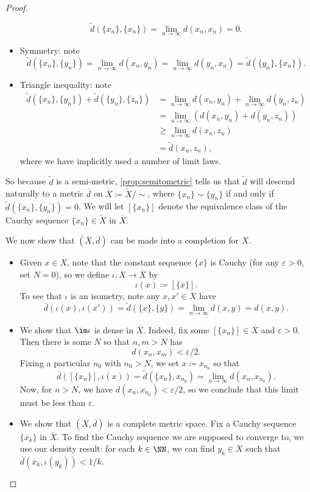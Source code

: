 \documentclass[../notes.tex]{subfiles}
\begin{document}
\begin{proof}
\begin{itemize}
		\[\widetilde d(\{x_n\},\{x_n\})=\lim_{n\to\infty}d(x_n,x_n)=0.\]
		\item Symmetry: note
		\[\widetilde d(\{x_n\},\{y_n\})=\lim_{n\to\infty}d(x_n,y_n)=\lim_{n\to\infty}d(y_n,x_n)=\widetilde d(\{y_n\},\{x_n\}).\]
		\item Triangle inequality: note
		\begin{align*}
			\widetilde d(\{x_n\},\{y_n\})+\widetilde d(\{y_n\},\{z_n\}) &= \lim_{n\to\infty}d(x_n,y_n)+\lim_{n\to\infty}d(y_n,z_n) \\
			&= \lim_{n\to\infty}(d(x_n,y_n)+d(y_n,z_n)) \\
			&\ge \lim_{n\to\infty}d(x_n,z_n) \\
			&= \widetilde d(x_n,z_n),
		\end{align*}
		where we have implicitly used a number of limit laws.
	\end{itemize}
	So because $\widetilde d$ is a semi-metric, \autoref{prop:semitometric} tells us that $\widetilde d$ will descend naturally to a metric $\overline d$ on $\overline X\coloneqq\widetilde X/{\sim}$, where $\{x_n\}\sim\{y_n\}$ if and only if $\widetilde d(\{x_n\},\{y_n\})=0$. We will let $[\{x_n\}]$ denote the equivalence class of the Cauchy sequence $\{x_n\}\in\widetilde X$ in $\overline X$.

	We now show that $(\overline X,\overline d)$ can be made into a completion for $X$.
	\begin{itemize}
		\item Given $x\in X$, note that the constant sequence $\{x\}$ is Cauchy (for any $\varepsilon>0$, set $N=0$), so we define $\iota\colon X\to\overline X$ by
		\[\iota(x)\coloneqq[\{x\}].\]
		To see that $\iota$ is an isometry, note any $x,x'\in X$ have
		\[\overline d(\iota(x),\iota(x'))=\widetilde d(\{x\},\{y\})=\lim_{n\to\infty}d(x,y)=d(x,y).\]
		\item We show that $\im\iota$ is dense in $\overline X$. Indeed, fix some $[\{x_n\}]\in\overline X$ and $\varepsilon>0$. Then there is some $N$ so that $n,m>N$ has
		\[d(x_n,x_m)<\varepsilon/2.\]
		Fixing a particular $n_0$ with $n_0>N$, we set $x\coloneqq x_{n_0}$ so that
		\[\overline d([\{x_n\}],\iota(x))=\widetilde d(\{x_n\},x_{n_0})=\lim_{n\to\infty}d(x_n,x_{n_0}).\]
		Now, for $n>N$, we have $d(x_n,x_{n_0})<\varepsilon/2$, so we conclude that this limit must be less than $\varepsilon$.
		\item We show that $(\overline X,\overline d)$ is a complete metric space. Fix a Cauchy sequence $\{\overline x_k\}$ in $\overline X$. To find the Cauchy sequence we are supposed to converge to, we use our density result: for each $k\in\NN$, we can find $y_k\in X$ such that $\overline d(\overline x_k,\iota(y_k))<1/k$.


\end{itemize}
\end{proof}
\end{document}
